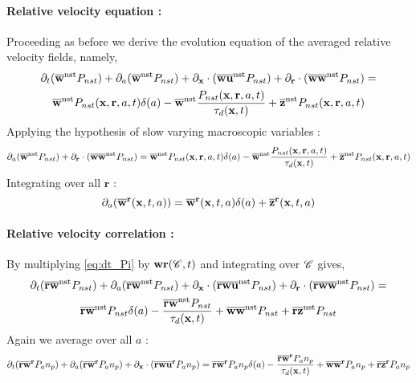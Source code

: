 \paragraph[short]{Relative velocity equation :}
Proceeding as before we derive the evolution equation of the averaged relative velocity fields, 
namely, 
\begin{multline}
    \partial_t (\overline{\textbf{w}}^\text{nst} P_{nst})
    + \partial_a (\overline{\textbf{w}}^\text{nst} P_{nst})
    + \partial_{\textbf{x}} \cdot (\overline{\textbf{w}\textbf{u} }^\text{nst} P_{nst})
    + \partial_{\textbf{r}}  \cdot (\overline{\textbf{w}\textbf{w}}^\text{nst} P_{nst})
    =  \\
    \overline{\textbf{w}}^\text{nst} P_{nst}(\textbf{x},\textbf{r},a,t)\delta(a)
    - \overline{\textbf{w}}^\text{nst}  \frac{P_{nst}(\textbf{x},\textbf{r},a,t)}{\tau_d(\textbf{x},t)}
    + \overline{\textbf{z}}^\text{nst}P_{nst}(\textbf{x},\textbf{r},a,t)
\end{multline}
Applying the hypothesis of slow varying macroscopic variables : 
\begin{equation}
    \partial_a (\overline{\textbf{w}}^\text{nst} P_{nst})
    +\partial_{\textbf{r}}  \cdot (\overline{\textbf{w}\textbf{w}}^\text{nst} P_{nst})
    =  
    \overline{\textbf{w}}^\text{nst} P_{nst}(\textbf{x},\textbf{r},a,t)\delta(a)
    - \overline{\textbf{w}}^\text{nst}  \frac{P_{nst}(\textbf{x},\textbf{r},a,t)}{\tau_d(\textbf{x},t)}
    + \overline{\textbf{z}}^\text{nst}P_{nst}(\textbf{x},\textbf{r},a,t)
\end{equation}
Integrating over all $\textbf{r}$ :
\begin{equation}
    \partial_a (\overline{\textbf{w}}^{\textbf{r}}(\textbf{x},t,a))
    =  
    \overline{\textbf{w}}^{\textbf{r}}(\textbf{x},t,a)\delta(a)
    + \overline{\textbf{z}}^{\textbf{r}}(\textbf{x},t,a)
    \label{eq:da_w}
\end{equation}
 
\paragraph{Relative velocity correlation :}
By multiplying \ref{eq:dt_Pi} by $\textbf{wr} (\mathscr{C},t)$ and integrating over $\mathscr{C}$ gives,
\begin{multline}
    \partial_t (\overline{\textbf{rw}}^\text{nst} P_{nst})
    + \partial_a (\overline{\textbf{rw}}^\text{nst} P_{nst})
    + \partial_{\textbf{x}} \cdot (\overline{\textbf{rw}\textbf{u} }^\text{nst} P_{nst})
    + \partial_{\textbf{r}}  \cdot (\overline{\textbf{rw}\textbf{w}}^\text{nst} P_{nst})
    =  \\
    \overline{\textbf{rw}}^\text{nst} P_{nst}\delta(a)
    -  \frac{\overline{\textbf{rw}}^\text{nst} P_{nst}}{\tau_d(\textbf{x},t)}
    + \overline{\textbf{ww}}^\text{nst}P_{nst}
    + \overline{\textbf{rz}}^\text{nst}P_{nst}
\end{multline}
Again we average over all $a$ : 
\begin{multline}
    \partial_t (\overline{\textbf{rw}}^{\textbf{r}} P_{a}n_p)
    + \partial_a (\overline{\textbf{rw}}^{\textbf{r}} P_{a}n_p)
    + \partial_{\textbf{x}} \cdot (\overline{\textbf{rw}\textbf{u} }^{\textbf{r}} P_{a}n_p)
    =  
    \overline{\textbf{rw}}^{\textbf{r}} P_{a}n_p\delta(a)
    -  \frac{\overline{\textbf{rw}}^{\textbf{r}} P_{a}n_p}{\tau_d(\textbf{x},t)}
    + \overline{\textbf{ww}}^{\textbf{r}}P_{a}n_p
    + \overline{\textbf{rz}}^{\textbf{r}}P_{a}n_p
\end{multline}


